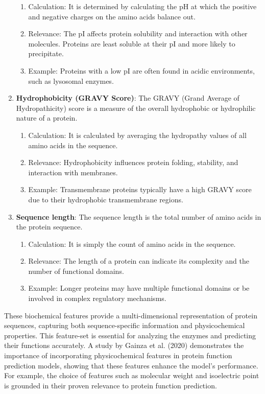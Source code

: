 \begin{enumerate}
    \begin{enumerate}
        \item Calculation: It is determined by calculating the pH at which the positive and negative charges on the amino acids balance out.
        \item Relevance: The pI affects protein solubility and interaction with other molecules. Proteins are least soluble at their pI and more likely to precipitate.
        \item Example: Proteins with a low pI are often found in acidic environments, such as lysosomal enzymes.
    \end{enumerate}
    \item \textbf{Hydrophobicity (GRAVY Score)}: The GRAVY (Grand Average of Hydropathicity) score is a measure of the overall hydrophobic or hydrophilic nature of a protein.
    \begin{enumerate}
        \item Calculation: It is calculated by averaging the hydropathy values of all amino acids in the sequence.
        \item Relevance: Hydrophobicity influences protein folding, stability, and interaction with membranes.
        \item Example: Transmembrane proteins typically have a high GRAVY score due to their hydrophobic transmembrane regions.
    \end{enumerate}
    \item \textbf{Sequence length}: The sequence length is the total number of amino acids in the protein sequence.
    \begin{enumerate}
        \item Calculation: It is simply the count of amino acids in the sequence.
        \item Relevance: The length of a protein can indicate its complexity and the number of functional domains.
        \item Example: Longer proteins may have multiple functional domains or be involved in complex regulatory mechanisms.
    \end{enumerate}
\end{enumerate}

These biochemical features provide a multi-dimensional representation of protein sequences, capturing both sequence-specific information and physicochemical properties. This feature-set is essential for analyzing the enzymes and predicting their functions accurately. A study by Gainza et al. (2020) demonstrates the importance of incorporating physicochemical features in protein function prediction models, showing that these features enhance the model's performance. For example, the choice of features such as molecular weight and isoelectric point is grounded in their proven relevance to protein function prediction. \autocite{gainzaDecipheringInteractionFingerprints2020}
